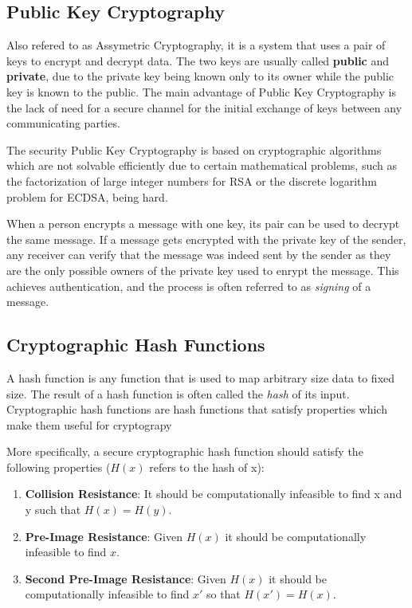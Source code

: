 \subsection{Public Key Cryptography}
Also refered to as Assymetric Cryptography, it is a system that uses a pair of keys to encrypt and decrypt data. The two keys are usually called \textbf{public} and \textbf{private}, due to the private key being known only to its owner while the public key is known to the public. The main advantage of Public Key Cryptography is the lack of need for a secure channel for the initial exchange of keys between any communicating parties.

The security Public Key Cryptography is based on cryptographic algorithms which are not solvable efficiently due to certain mathematical problems, such as the factorization of large integer numbers for RSA or the discrete logarithm problem for ECDSA, being hard.

When a person encrypts a message with one key, its pair can be used to decrypt the same message. If a message gets encrypted with the private key of the sender, any receiver can verify that the message was indeed sent by the sender as they are the only possible owners of the private key used to enrypt the message. This achieves authentication, and the process is often referred to as \textit{signing} of a message. 


\subsection{Cryptographic Hash Functions}

A hash function is any function that is used to map arbitrary size data to fixed size. The result of a hash function is often called the \textit{hash} of its input. Cryptographic hash functions are hash functions that satisfy properties which make them useful for cryptograpy %

More specifically, a secure cryptographic hash function should satisfy the following properties (\(H(x)\) refers to the hash of x):
\begin{enumerate}
   \item \textbf{Collision Resistance}: It should be computationally infeasible to find x and y such that \(H(x) = H(y)\). 
   \item \textbf{Pre-Image Resistance}: Given \(H(x)\) it should be computationally infeasible to find \(x\).
   \item \textbf{Second Pre-Image Resistance}: Given \(H(x)\) it should be computationally infeasible to find \(x'\) so that \(H(x') = H(x)\).
\end{enumerate}


